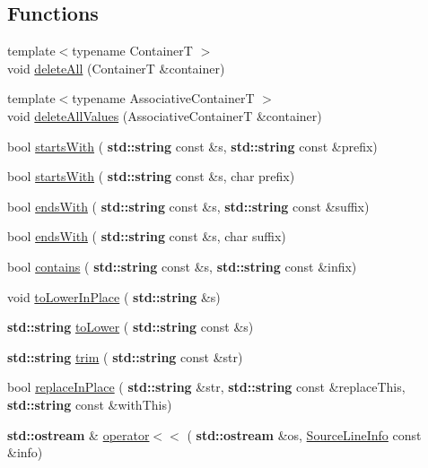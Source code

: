 \subsection*{Functions}
\begin{DoxyCompactItemize}
\item 
{\footnotesize template$<$typename ContainerT $>$ }\\void \hyperlink{namespace_catch_aadf9786550a462740ec355f8219863a9}{delete\+All} (ContainerT \&container)
\item 
{\footnotesize template$<$typename Associative\+ContainerT $>$ }\\void \hyperlink{namespace_catch_af2fcec1d4bd984fe19ff8b9a432c36a8}{delete\+All\+Values} (Associative\+ContainerT \&container)
\item 
bool \hyperlink{namespace_catch_a695f62327be0676e046291eeaae15110}{starts\+With} (\textbf{ std\+::string} const \&s, \textbf{ std\+::string} const \&prefix)
\item 
bool \hyperlink{namespace_catch_acad23751846ac23d0f379e34f5adebb1}{starts\+With} (\textbf{ std\+::string} const \&s, char prefix)
\item 
bool \hyperlink{namespace_catch_ada025504f627feaf9ac68ca391515dff}{ends\+With} (\textbf{ std\+::string} const \&s, \textbf{ std\+::string} const \&suffix)
\item 
bool \hyperlink{namespace_catch_afd801a3e33fd7a8b91ded0d02747a93f}{ends\+With} (\textbf{ std\+::string} const \&s, char suffix)
\item 
bool \hyperlink{namespace_catch_aa52974b0e426e7e2fbd725a900e9c36e}{contains} (\textbf{ std\+::string} const \&s, \textbf{ std\+::string} const \&infix)
\item 
void \hyperlink{namespace_catch_a0760dbe87d090a55a35414db57d272c4}{to\+Lower\+In\+Place} (\textbf{ std\+::string} \&s)
\item 
\textbf{ std\+::string} \hyperlink{namespace_catch_ac036a17412d318598ffda8e1fe7a1177}{to\+Lower} (\textbf{ std\+::string} const \&s)
\item 
\textbf{ std\+::string} \hyperlink{namespace_catch_a084108b47f37d8bfd5db51c50c7451b3}{trim} (\textbf{ std\+::string} const \&str)
\item 
bool \hyperlink{namespace_catch_afe4e6770da547e43e9e4eeaa05f946ea}{replace\+In\+Place} (\textbf{ std\+::string} \&str, \textbf{ std\+::string} const \&replace\+This, \textbf{ std\+::string} const \&with\+This)
\item 
\textbf{ std\+::ostream} \& \hyperlink{namespace_catch_a6ec18b5054d7fdfdde861c580b082995}{operator$<$$<$} (\textbf{ std\+::ostream} \&os, \hyperlink{struct_catch_1_1_source_line_info}{Source\+Line\+Info} const \&info)

\end{DoxyCompactItemize}
